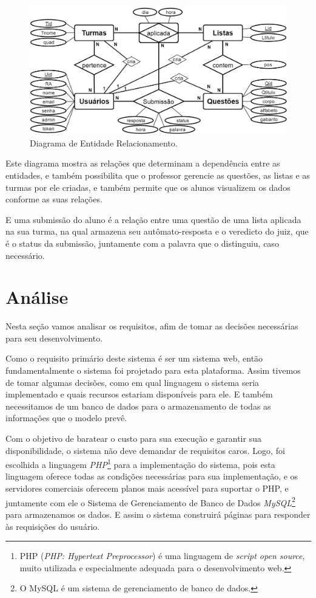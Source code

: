 \documentclass[
	12pt,				%
	openany,
	oneside,
	a4paper,			%
	english,			%
	brazil				%
	]{abntex2}
\begin{document}
\begin{figure}[H]
  \centering
  \includegraphics[width=\textwidth]{diagDER.png}%
  \caption{Diagrama de Entidade Relacionamento.}
  \label{fig:DER}
\end{figure}

  Este diagrama mostra as relações que determinam a dependência entre as entidades, e também possibilita que o professor gerencie as questões, as listas e as turmas por ele criadas, e também permite que os alunos visualizem os dados conforme as suas relações.

  E uma submissão do aluno é a relação entre uma questão de uma lista aplicada na sua turma, na qual armazena seu autômato-resposta e o veredicto do juiz, que é o status da submissão, juntamente com a palavra que o distinguiu, caso necessário.





\section{Análise}
  Nesta seção vamos analisar os requisitos, afim de tomar as decisões necessárias para seu desenvolvimento.

  Como o requisito primário deste sistema é ser um sistema web, então fundamentalmente o sistema foi projetado para esta plataforma. Assim tivemos de tomar algumas decisões, como em qual linguagem o sistema seria implementado e quais recursos estariam disponíveis para ele. E também necessitamos de um banco de dados para o armazenamento de todas as informações que o modelo prevê.

  Com o objetivo de baratear o custo para sua execução e garantir sua disponibilidade, o sistema não deve demandar de requisitos caros. Logo, foi escolhida a linguagem \textit{PHP}\footnote{PHP (\textit{PHP: Hypertext Preprocessor}) é uma linguagem de \textit{script open source}, muito utilizada e especialmente adequada para o desenvolvimento web.} para a implementação do sistema, pois esta linguagem oferece todas as condições necessárias para sua implementação, e os servidores comerciais oferecem planos mais acessível para suportar o PHP, e juntamente com ele o Sistema de Gerenciamento de Banco de Dados \textit{MySQL}\footnote{O MySQL é um sistema de gerenciamento de banco de dados.} para armazenamos os dados. E assim o sistema construirá páginas para responder às requisições do usuário.
\end{document}
